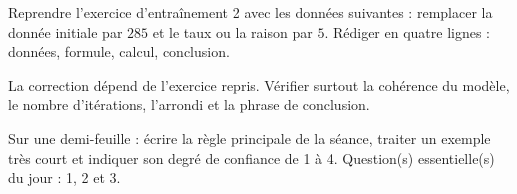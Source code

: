 
\begin{homework}Reprendre l'exercice d'entraînement 2 avec les données suivantes : remplacer la donnée initiale par $285$ et le taux ou la raison par $5$. Rédiger en quatre lignes : données, formule, calcul, conclusion.\end{homework}
\begin{solution}La correction dépend de l'exercice repris. Vérifier surtout la cohérence du modèle, le nombre d'itérations, l'arrondi et la phrase de conclusion.\end{solution}

\begin{exitticket}[3 minutes]Sur une demi-feuille : écrire la règle principale de la séance, traiter un exemple très court et indiquer son degré de confiance de 1 à 4. Question(s) essentielle(s) du jour : 1, 2 et 3.\end{exitticket}

